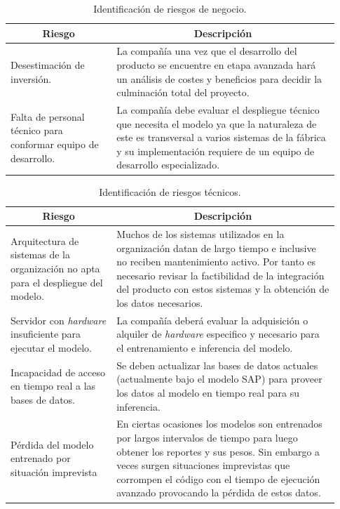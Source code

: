 \documentclass[a4paper,12pt]{article}
\begin{document}
\begin{table}[H]
	\centering
	\begin{tabular}{p{0.3\linewidth} p{0.63\linewidth}}
		\hline
		\multicolumn{1}{c}{\textbf{Riesgo}}                             &   
		\multicolumn{1}{c}{\textbf{Descripción}} \\ \hline
		Desestimación de inversión.                                   &   
		La compañía una vez que el desarrollo del producto se encuentre en etapa avanzada hará un análisis de costes y beneficios para decidir la culminación total del proyecto. \\
		Falta de personal técnico para conformar equipo de desarrollo. &   
		La compañía debe evaluar el despliegue técnico que necesita el modelo ya que la naturaleza de este es transversal a varios sistemas de la fábrica y su implementación requiere de un equipo de desarrollo especializado. \\ \hline
	\end{tabular}
	\caption{Identificación de riesgos de negocio.}
	\label{tab:business-risks}
\end{table}

\begin{table}[H]
	\centering
	\begin{tabular}{p{0.3\linewidth} p{0.63\linewidth}}
		\hline
		\multicolumn{1}{c}{\textbf{Riesgo}}                                                                                  &   
		\multicolumn{1}{c}{\textbf{Descripción}} \\ \hline
		Arquitectura de sistemas de la organización no apta para el despliegue del modelo.                                  &   
		Muchos de los sistemas utilizados en la organización datan de largo tiempo e inclusive no reciben mantenimiento activo. Por tanto es necesario revisar la factibilidad de la integración del producto con estos sistemas y la obtención de los datos necesarios. \\
		Servidor con \textit{hardware} insuficiente para ejecutar el modelo.                                                 &   
		La compañía deberá evaluar la adquisición o alquiler de \textit{hardware} especifico y necesario para el entrenamiento e inferencia del modelo. \\
		Incapacidad de acceso en tiempo real a las bases de datos. &   
		Se deben actualizar las bases de datos actuales (actualmente bajo el modelo SAP) para proveer los datos al modelo en tiempo real para su inferencia. \\
		Pérdida del modelo entrenado por situación imprevista                                                              &   
		En ciertas ocasiones los modelos son entrenados por largos intervalos de tiempo para luego obtener los reportes y sus pesos. Sin embargo a veces surgen situaciones imprevistas que corrompen el código con el tiempo de ejecución avanzado provocando la pérdida de estos datos. \\ \hline
	\end{tabular}
	\caption{Identificación de riesgos técnicos.}
	\label{tab:technical-risks}
\end{table}
\end{document}
